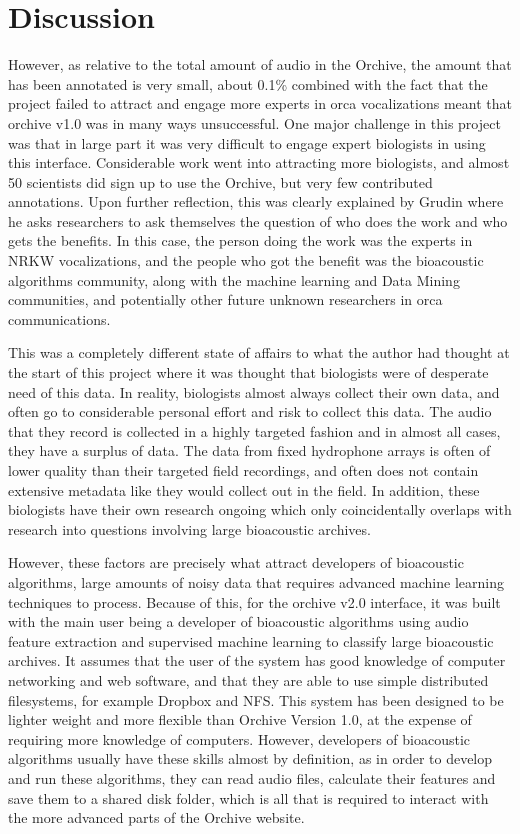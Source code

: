 \section{Discussion}

However, as relative to the total amount of audio in the Orchive, the
amount that has been annotated is very small, about 0.1\% combined
with the fact that the project failed to attract and engage more
experts in orca vocalizations meant that orchive v1.0 was in many ways
unsuccessful.  One major challenge in this project was that in large
part it was very difficult to engage expert biologists in using this
interface.  Considerable work went into attracting more biologists,
and almost 50 scientists did sign up to use the Orchive, but very few
contributed annotations.  Upon further reflection, this was clearly
explained by Grudin \cite{grudin1988cscw} where he asks researchers to
ask themselves the question of who does the work and who gets the
benefits.  In this case, the person doing the work was the experts in
NRKW vocalizations, and the people who got
the benefit was the bioacoustic algorithms community, along with the
machine learning and Data Mining communities, and potentially other
future unknown researchers in orca communications.

This was a completely different state of affairs to what the author
had thought at the start of this project where it was thought that
biologists were of desperate need of this data.  In reality,
biologists almost always collect their own data, and often go to
considerable personal effort and risk to collect this data.  The audio
that they record is collected in a highly targeted fashion and in
almost all cases, they have a surplus of data.  The data from fixed
hydrophone arrays is often of lower quality than their targeted field
recordings, and often does not contain extensive metadata like they
would collect out in the field.  In addition, these biologists have
their own research ongoing which only coincidentally overlaps with
research into questions involving large bioacoustic archives.

However, these factors are precisely what attract developers of
bioacoustic algorithms, large amounts of noisy data that requires
advanced machine learning techniques to process.  Because of this, for
the orchive v2.0 interface, it was built with the main user being a
developer of bioacoustic algorithms using audio feature extraction and
supervised machine learning to classify large bioacoustic archives.
It assumes that the user of the system has good knowledge of computer
networking and web software, and that they are able to use simple
distributed filesystems, for example Dropbox and NFS.  This system has
been designed to be lighter weight and more flexible than Orchive
Version 1.0, at the expense of requiring more knowledge of computers.
However, developers of bioacoustic algorithms usually have these
skills almost by definition, as in order to develop and run these
algorithms, they can read audio files, calculate their features and
save them to a shared disk folder, which is all that is required to
interact with the more advanced parts of the Orchive website. 

